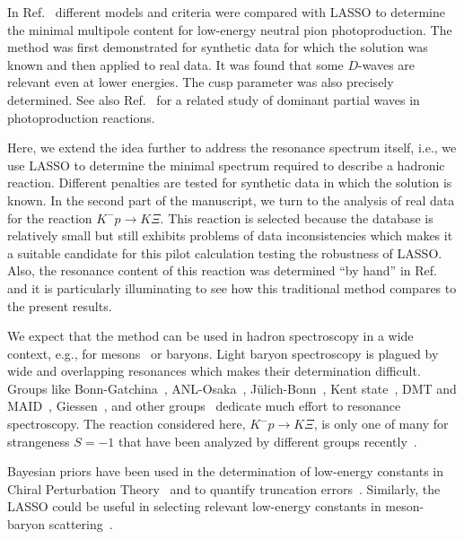 \documentclass[10pt,aps,prc,superscriptaddress,twoside,twocolumn,nofootinbib,showpacs,preprintnumbers]{revtex4-1}
\begin{document}
In Ref.~\cite{Landay:2016cjw} different models and criteria were compared with LASSO to determine the minimal multipole content for low-energy neutral pion photoproduction. The method was first demonstrated for synthetic data for which the solution was known and then applied to real data. It was found that some $D$-waves are relevant even at lower energies. The cusp parameter was also precisely determined. See also Ref.~\cite{Wunderlich:2016imj} for a related study of dominant partial waves in photoproduction reactions.

Here, we extend the idea further to address the resonance spectrum itself, i.e., we use LASSO to determine the minimal spectrum required to describe a hadronic reaction. Different penalties are tested for synthetic data in which the solution is known. In the second part of the manuscript, we turn to the analysis of real data for the reaction $K^-p\to K\Xi$. This reaction is selected because the database is relatively small but still exhibits problems of data inconsistencies which makes it a suitable candidate for this pilot calculation testing the robustness of LASSO. Also, the resonance content of this reaction was determined ``by hand'' in Ref.~\cite{Jackson:2015dva} and it is particularly illuminating to see how this traditional method compares to the present results.

We expect that the method can be used in hadron spectroscopy in a wide context, e.g., for mesons~\cite{Jackura:2017amb, Molina:2017iaa, Pilloni:2016obd, Mai:2017vot, Kamano:2011ih} or baryons. Light baryon spectroscopy is plagued by wide and overlapping resonances which makes their determination difficult. Groups like Bonn-Gatchina~\cite{Anisovich:2011fc, Collins:2017sgu, Anisovich:2017ygb}, ANL-Osaka~\cite{Kamano:2013iva, Kamano:2014zba, Kamano:2015hxa}, J\"ulich-Bonn~\cite{Ronchen:2015vfa,Ronchen:2014cna, Ronchen:2012eg}, Kent state~\cite{Shrestha:2012ep, Zhang:2013sva, Zhang:2013cua}, DMT and MAID~\cite{Kamalov:2000en, Chiang:2002vq, Tiator:2010rp, Drechsel:1998hk, Drechsel:2007if}, Giessen~\cite{Shklyar:2014kra, Cao:2013psa}, and other groups~\cite{Mart:2017mwj} dedicate much effort to resonance spectroscopy. The reaction considered here, $K^-p\to K\Xi$, is only one of many for strangeness $S=-1$ that have been analyzed by different groups recently~\cite{Fernandez-Ramirez:2015tfa, Kamano:2014zba, Kamano:2015hxa, Zhang:2013sva, Zhang:2013cua}. 

Bayesian priors have been used in the determination of low-energy constants in Chiral Perturbation Theory~\cite{Wesolowski:2015fqa} and to quantify truncation errors~\cite{Furnstahl:2015rha}. Similarly, the LASSO could be useful in selecting relevant low-energy constants in meson-baryon scattering~\cite{Mai:2012dt, Ruic:2011wf, Bruns:2010sv, Mai:2009ce}.
\end{document}
